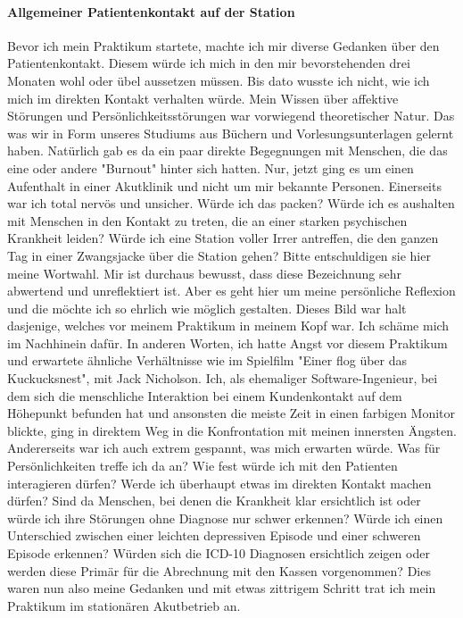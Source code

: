 \paragraph{Allgemeiner Patientenkontakt auf der Station}
Bevor ich mein Praktikum startete, machte ich mir diverse Gedanken über den Patientenkontakt. Diesem würde ich mich in den mir bevorstehenden drei Monaten wohl oder übel aussetzen müssen. Bis dato wusste ich nicht, wie ich mich im direkten Kontakt verhalten würde. Mein Wissen über affektive Störungen und Persönlichkeitsstörungen war vorwiegend theoretischer Natur. Das was wir in Form unseres Studiums aus Büchern und Vorlesungsunterlagen gelernt haben. Natürlich gab es da ein paar direkte Begegnungen mit Menschen, die das eine oder andere "Burnout" hinter sich hatten. Nur, jetzt ging es um einen Aufenthalt in einer Akutklinik und nicht um mir bekannte Personen. Einerseits war ich total nervös und unsicher. Würde ich das packen? Würde ich es aushalten mit Menschen in den Kontakt zu treten, die an einer starken psychischen Krankheit leiden? Würde ich eine Station voller Irrer antreffen, die den ganzen Tag in einer Zwangsjacke über die Station gehen? Bitte entschuldigen sie hier meine Wortwahl. Mir ist durchaus bewusst, dass diese Bezeichnung sehr abwertend und unreflektiert ist. Aber es geht hier um meine persönliche Reflexion und die möchte ich so ehrlich wie möglich gestalten. Dieses Bild war halt dasjenige, welches vor meinem Praktikum in meinem Kopf war. Ich schäme mich im Nachhinein dafür. In anderen Worten, ich hatte Angst vor diesem Praktikum und erwartete ähnliche Verhältnisse wie im Spielfilm "Einer flog über das Kuckucksnest", mit Jack Nicholson. Ich, als ehemaliger Software-Ingenieur, bei dem sich die menschliche Interaktion bei einem Kundenkontakt auf dem Höhepunkt befunden hat und ansonsten die meiste Zeit in einen farbigen Monitor blickte, ging in direktem Weg in die Konfrontation mit meinen innersten Ängsten. Andererseits war ich auch extrem gespannt, was mich erwarten würde. Was für Persönlichkeiten treffe ich da an? Wie fest würde ich mit den Patienten interagieren dürfen? Werde ich überhaupt etwas im direkten Kontakt machen dürfen? Sind da Menschen, bei denen die Krankheit klar ersichtlich ist oder würde ich ihre Störungen ohne Diagnose nur schwer erkennen? Würde ich einen Unterschied zwischen einer leichten depressiven Episode und einer schweren Episode erkennen? Würden sich die ICD-10 Diagnosen ersichtlich zeigen oder werden diese Primär für die Abrechnung mit den Kassen vorgenommen? Dies waren nun also meine Gedanken und mit etwas zittrigem Schritt trat ich mein Praktikum im stationären Akutbetrieb an.


